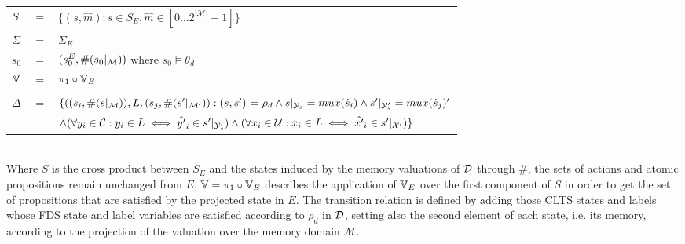 \vspace{1em}
\begin{tabular}{ l c l }
	$S$ &$=$& $\{(s,\hat{m}) : s \in S_E, \hat{m} \in [0\ldots2^{|\mathcal{M}|}-1] \}$\\
	$\Sigma$ &$=$&$\Sigma_E$\\	
	$s_0$&$=$&$(s_0^{E}, \#(s_0|_{\mathcal{M}}))$ where $s_0 \models \theta_d$ \\
	$\mathbb{V}$&$=$&$\pi_1 \circ \mathbb{V}_E$\\
	&&\\
	$\Delta$&$=$&$\{((s_i,\#(s|_{\mathcal{M}})),L,(s_j,\#(s'|_{\mathcal{M}'})): (s, s') \models \rho_d \wedge  s|_{{\mathcal{Y}}_s} = mux(\hat{s}_{i})  \wedge s'|_{{\mathcal{Y}}'_s} = mux(\hat{s}_{j})'$ \\
	&&$\wedge (\forall y_i \in \mathcal{C} : y_i \in L \iff \hat{y'}_i \in s'|_{{\mathcal{Y}}'_c})  \wedge (\forall x_i \in \mathcal{U} : x_i \in L \iff \hat{x'}_i \in s'|_{{\mathcal{X}}'})  \}$\\
\end{tabular}
\vspace{1em}
\\
Where $S$ is the cross product between $S_E$ and the states induced by the memory valuations of $\mathcal{D}$ through $\#$, the sets of actions and atomic propositions remain unchanged from $E$, $\mathbb{V}=\pi_1 \circ \mathbb{V}_E$ describes the application of $\mathbb{V}_E$ over the first component of $S$ in order to get the set of propositions that are satisfied by the projected state in $E$. The transition relation is defined by adding those CLTS states and labels whose FDS state and label variables are satisfied according to $\rho_d$ in $\mathcal{D}$, setting also the second element of each state, i.e. its memory, according to the projection of the valuation over the memory domain $\mathcal{M}$.

